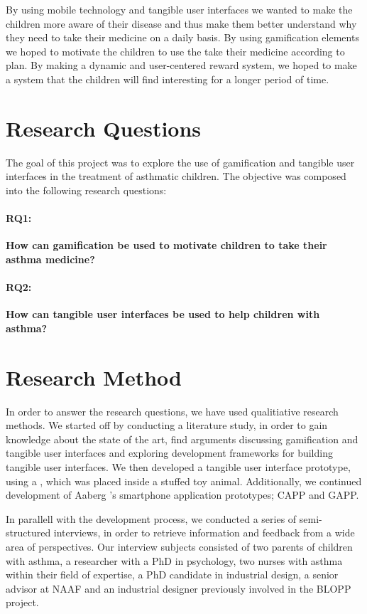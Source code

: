 By using mobile technology and tangible user interfaces we wanted to make the children more aware of their disease and thus make them better understand why they need to take their medicine on a daily basis. 
By using gamification elements we hoped to motivate the children to use the take their medicine according to plan. By making a dynamic and user-centered reward system, we hoped to make a system that the children will find interesting for a longer period of time.  



\section{Research Questions}
\label{sec:researchquestions}
The goal of this project was to explore the use of gamification and tangible user interfaces in the treatment of asthmatic children. The objective was composed into the following research questions: 

\paragraph{RQ1:}
\textbf{How can gamification be used to motivate children to take their asthma medicine?}


\paragraph{RQ2:}
\textbf{How can tangible user interfaces be used to help children with asthma?}


\section{Research Method}
\label{sec:researchmethod}
In order to answer the research questions, we have used qualitiative research methods. 
We started off by conducting a literature study, in order to gain knowledge about the state of the art, find arguments discussing gamification and tangible user interfaces and exploring development frameworks for building tangible user interfaces. We then developed a tangible user interface prototype, using a \rpi{}, which was placed inside a stuffed toy animal. Additionally, we continued development of Aaberg \etal{}'s smartphone application prototypes; CAPP and GAPP. 

In parallell with the development process, we conducted a series of semi-structured interviews, in order to retrieve information and feedback from a wide area of perspectives. Our interview subjects consisted of two parents of children with asthma, a researcher with a PhD in psychology, two nurses with asthma within their field of expertise, a PhD candidate in industrial design, a senior advisor at NAAF and an industrial designer previously involved in the BLOPP project. 

